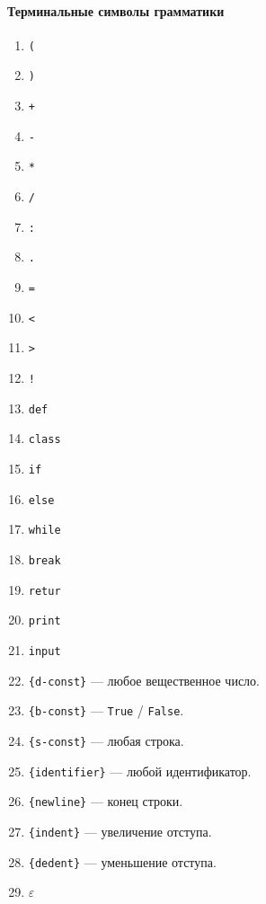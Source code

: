 \documentclass[a4paper,10pt,notitlepage,pdftex]{scrreprt}
\begin{document}
        \paragraph{Терминальные символы грамматики}
        \label{para:term}
        \begin{multicols}{3}
            \begin{enumerate}
                \item \verb'('
                \item \verb')'
                \item \verb'+'
                \item \verb'-'
                \item \verb'*'
                \item \verb'/'
                \item \verb':'
                \item \verb'.'
                \item \verb'='
                \item \verb'<'
                \item \verb'>'
                \item \verb'!'
                \item \verb'def'
                \item \verb'class'
                \item \verb'if'
                \item \verb'else'
                \item \verb'while'
                \item \verb'break'
                \item \verb'retur'
                \item \verb'print'
                \item \verb'input'
                \item \verb'{d-const}' --- любое вещественное число.
                \item \verb'{b-const}' --- \verb'True' / \verb'False'.
                \item \verb'{s-const}' --- любая строка.
                \item \verb'{identifier}' --- любой идентификатор.
                \item \verb'{newline}' --- конец строки.
                \item \verb'{indent}' --- увеличение отступа.
                \item \verb'{dedent}' --- уменьшение отступа.
                \item $\varepsilon$
            \end{enumerate}
        \end{multicols}
\end{document}
